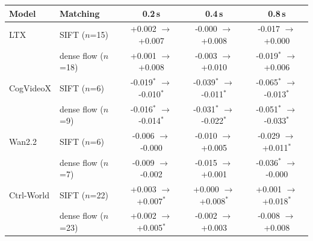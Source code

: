 \begin{tabular}{llccc}
\toprule
Model & Matching & 0.2\,s & 0.4\,s & 0.8\,s \\
\midrule
LTX & SIFT ($n$=15) & +0.002 $\to$ +0.007 & -0.000 $\to$ +0.008 & -0.017 $\to$ +0.000 \\
 & dense flow ($n$=18) & +0.001 $\to$ +0.008 & -0.003 $\to$ +0.010 & -0.019$^*$ $\to$ +0.006 \\
CogVideoX & SIFT ($n$=6) & -0.019$^*$ $\to$ -0.010$^*$ & -0.039$^*$ $\to$ -0.011$^*$ & -0.065$^*$ $\to$ -0.013$^*$ \\
 & dense flow ($n$=9) & -0.016$^*$ $\to$ -0.014$^*$ & -0.031$^*$ $\to$ -0.022$^*$ & -0.051$^*$ $\to$ -0.033$^*$ \\
Wan2.2 & SIFT ($n$=6) & -0.006 $\to$ -0.000 & -0.010 $\to$ +0.005 & -0.029 $\to$ +0.011$^*$ \\
 & dense flow ($n$=7) & -0.009 $\to$ -0.002 & -0.015 $\to$ +0.001 & -0.036$^*$ $\to$ -0.000 \\
Ctrl-World & SIFT ($n$=22) & +0.003 $\to$ +0.007$^*$ & +0.000 $\to$ +0.008$^*$ & +0.001 $\to$ +0.018$^*$ \\
 & dense flow ($n$=23) & +0.002 $\to$ +0.005$^*$ & -0.002 $\to$ +0.003 & -0.008 $\to$ +0.008 \\
\bottomrule
\end{tabular}